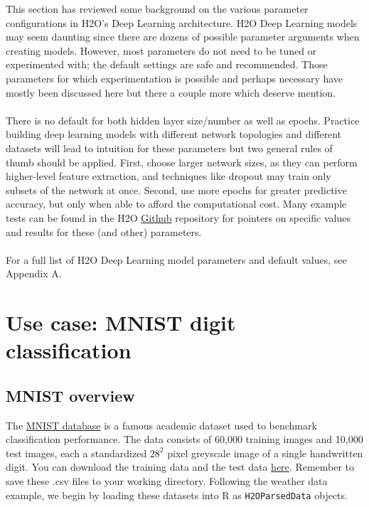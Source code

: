 \documentclass[11pt]{article}
\begin{document}
This section has reviewed some background on the various parameter configurations in H2O's Deep Learning architecture. H2O Deep Learning models may seem daunting since there are dozens of possible parameter arguments when creating models. However, most parameters do not need to be tuned or experimented with; the default settings are safe and recommended. Those parameters for which experimentation is possible and perhaps necessary have mostly been discussed here but there a couple more which deserve mention.
\\
\\
There is no default for both hidden layer size/number as well as epochs. Practice building deep learning models with different network topologies and different datasets will lead to intuition for these parameters but two general rules of thumb should be applied. First, choose larger network sizes, as they can perform higher-level feature extraction, and techniques like dropout may train only subsets of the network at once. Second, use more epochs for greater predictive accuracy, but only when able to afford the computational cost. Many example tests can be found in the H2O \href{https://github.com/0xdata/h2o/}{Github} repository for pointers on specific values and results for these (and other) parameters.
\\
\\
For a full list of H2O Deep Learning model parameters and default values, see Appendix A. 

\section{Use case: MNIST digit classification} \label{3}


\subsection{MNIST overview} \label{3.1}

The \href{http://yann.lecun.com/exdb/mnist/}{MNIST database} is a famous academic dataset used to benchmark classification performance. The data consists of 60,000 training images and 10,000 test images, each a standardized $28^2$ pixel greyscale image of a single handwritten digit. You can download the training data and the test data \href{https://github.com/0xdata/h2o/tree/master/smalldata/mnist}{here}. Remember to save these .csv files to your working directory. Following the weather data example, we begin by loading these datasets into R as \texttt{H2OParsedData} objects. 
\end{document}

